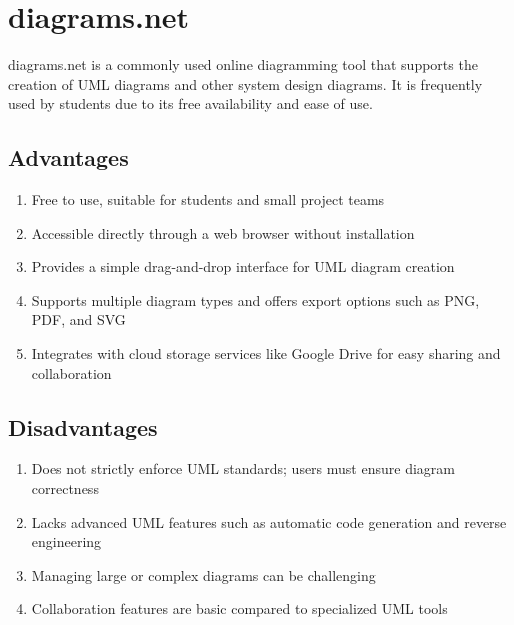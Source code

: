 \section{diagrams.net}

diagrams.net is a commonly used online diagramming tool that supports the creation of UML diagrams and other system design diagrams. It is frequently used by students due to its free availability and ease of use.

\subsection{Advantages}
\begin{enumerate}
    \item Free to use, suitable for students and small project teams
    \item Accessible directly through a web browser without installation
    \item Provides a simple drag-and-drop interface for UML diagram creation
    \item Supports multiple diagram types and offers export options such as PNG, PDF, and SVG
    \item Integrates with cloud storage services like Google Drive for easy sharing and collaboration
\end{enumerate}

\subsection{Disadvantages}
\begin{enumerate}
    \item Does not strictly enforce UML standards; users must ensure diagram correctness
    \item Lacks advanced UML features such as automatic code generation and reverse engineering
    \item Managing large or complex diagrams can be challenging
    \item Collaboration features are basic compared to specialized UML tools
\end{enumerate}
